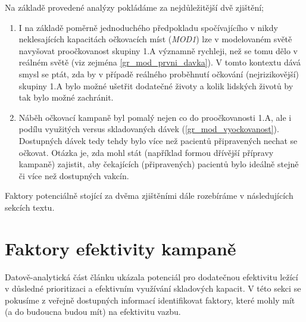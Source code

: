 Na základě provedené analýzy pokládáme za nejdůležitější dvě zjištění;
\begin{enumerate}
\item I na základě poměrně jednoduchého předpokladu spočívajícího v nikdy neklesajících kapacitách očkovacích míst (\emph{MOD1}) lze v modelovaném světě navyšovat proočkovanost skupiny 1.A významně rychleji, než se tomu dělo v reálném světě (viz zejména  \ref{gr_mod_prvni_davka}). V tomto kontextu dává smysl se ptát, zda by v případě reálného proběhnutí očkování (nejrizikovější) skupiny 1.A bylo možné ušetřit dodatečné životy a kolik lidských životů by tak bylo možné zachránit.
\item Náběh očkovací kampaně byl pomalý nejen co do proočkovanosti 1.A, ale i podílu využitých versus skladovaných dávek (\ref{gr_mod_vyockovanost}). Dostupných dávek tedy tehdy bylo více než pacientů připravených nechat se očkovat. Otázka je, zda mohl stát (například formou dřívější přípravy kampaně) zajistit, aby čekajících (připravených) pacientů bylo ideálně stejně či více než dostupných vakcín.
\end{enumerate}
Faktory potenciálně stojící za dvěma zjištěními dále rozebíráme v následujících sekcích textu.






\section*{Faktory efektivity kampaně}
\label{sec:shrnuti}


Datově-analytická část článku ukázala potenciál pro dodatečnou efektivitu ležící v důsledné prioritizaci a efektivním využívání skladových kapacit. V této sekci se pokusíme z veřejně dostupných informací identifikovat faktory, které mohly mít (a do budoucna budou mít) na efektivitu vazbu. %

